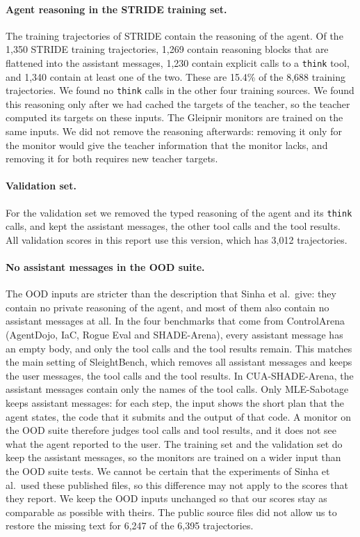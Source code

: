 \paragraph{Agent reasoning in the STRIDE training set.}
The training trajectories of STRIDE contain the reasoning of the agent.
Of the 1,350 STRIDE training trajectories, 1,269 contain reasoning blocks that are flattened into the assistant messages, 1,230 contain explicit calls to a \texttt{think} tool, and 1,340 contain at least one of the two.
These are 15.4\% of the 8,688 training trajectories.
We found no \texttt{think} calls in the other four training sources.
We found this reasoning only after we had cached the targets of the teacher, so the teacher computed its targets on these inputs.
The Gleipnir monitors are trained on the same inputs.
We did not remove the reasoning afterwards: removing it only for the monitor would give the teacher information that the monitor lacks, and removing it for both requires new teacher targets.

\paragraph{Validation set.}
For the validation set we removed the typed reasoning of the agent and its \texttt{think} calls, and kept the assistant messages, the other tool calls and the tool results.
All validation scores in this report use this version, which has 3,012 trajectories.

\paragraph{No assistant messages in the OOD suite.}
The OOD inputs are stricter than the description that Sinha et al.\ give: they contain no private reasoning of the agent, and most of them also contain no assistant messages at all.
In the four benchmarks that come from ControlArena (AgentDojo, IaC, Rogue Eval and SHADE-Arena), every assistant message has an empty body, and only the tool calls and the tool results remain.
This matches the main setting of SleightBench, which removes all assistant messages and keeps the user messages, the tool calls and the tool results.
In CUA-SHADE-Arena, the assistant messages contain only the names of the tool calls.
Only MLE-Sabotage keeps assistant messages: for each step, the input shows the short plan that the agent states, the code that it submits and the output of that code.
A monitor on the OOD suite therefore judges tool calls and tool results, and it does not see what the agent reported to the user.
The training set and the validation set do keep the assistant messages, so the monitors are trained on a wider input than the OOD suite tests.
We cannot be certain that the experiments of Sinha et al.\ used these published files, so this difference may not apply to the scores that they report.
We keep the OOD inputs unchanged so that our scores stay as comparable as possible with theirs.
The public source files did not allow us to restore the missing text for 6,247 of the 6,395 trajectories.

